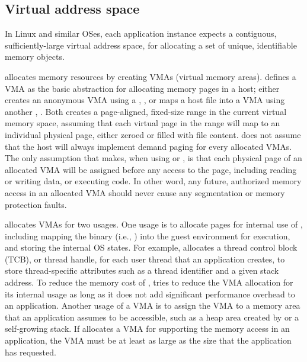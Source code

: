 \subsection{Virtual address space}
\label{sec:libos:vma}


In Linux and similar OSes, each application instance expects a contiguous, sufficiently-large virtual address space,
for allocating a set of unique, identifiable memory objects.



\thelibos{} allocates memory resources by creating VMAs (virtual memory areas).
\Thehostabi{} defines a VMA
as the basic abstraction for allocating memory pages
in a host;
\thelibos{} either creates an anonymous VMA using a \hostapi{}, ,
or maps a host file into a VMA using another \hostapi{}, .
Both \hostapis{} creates a page-aligned, fixed-size range in the
current virtual memory space,
assuming that each virtual page in the range
will map to an individual physical page, either zeroed or filled with file content.
\thelibos{} does not assume
that the host will always implement demand paging
for every allocated VMAs.
The only assumption that \thelibos{} makes, when using  or ,
is that each physical page of an allocated VMA
will be assigned
before any access to the page, including reading or writing data,
or executing code.
In other word, any future, authorized memory access
in an allocated VMA
should never cause any segmentation or memory protection faults.



\thelibos{} allocates VMAs for two usages.
One usage is to allocate pages for internal use of \thelibos{},
including mapping the \thelibos{} binary
(i.e., \thelibos{})
into the guest environment for execution,
and storing the internal OS states.
For example, \thelibos{} allocates a thread control block (TCB), or thread handle, for each user thread that an application creates, to store thread-specific attributes
such as a thread identifier and a given stack address.
To reduce the memory cost of \graphene{},
\thelibos{} tries to reduce the VMA allocation for its internal usage
as long as it does not add significant performance overhead to an application.
Another usage of a VMA
is to assign the VMA to a memory area that an application
assumes to be accessible, such as a heap area created by  or a self-growing stack.
If \thelibos{} allocates a VMA for supporting the memory access in an application,
the VMA must be at least as large as the size that the application has requested.



